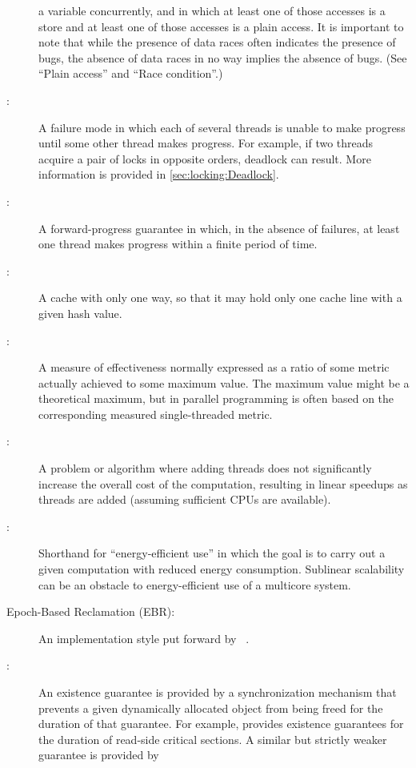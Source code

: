 \begin{description}
	a variable concurrently, and in which at least one of those
	accesses is a store and at least one of those accesses
	is a plain access.
	It is important to note that while the presence of data races
	often indicates the presence of bugs, the absence of data races
	in no way implies the absence of bugs.
	(See ``Plain access'' and ``Race condition''.)
\item[\IXG{Deadlock}:]
	A failure mode in which each of several threads is unable to
	make progress until some other thread makes progress.
	For example, if two threads acquire a pair of locks in opposite
	orders, deadlock can result.
	More information is provided in
	\cref{sec:locking:Deadlock}.
\item[\IXG{Deadlock Free}:]
	A forward-progress guarantee in which, in the absence of
	failures, at least one thread makes progress within a finite
	period of time.
\item[\IXGh{Direct-Mapped}{Cache}:]
	A cache with only one way, so that it may hold only one cache
	line with a given hash value.
\item[\IXG{Efficiency}:]
	A measure of effectiveness normally expressed as a ratio
	of some metric actually achieved to some maximum value.
	The maximum value might be a theoretical maximum, but in
	parallel programming is often based on the corresponding
	measured single-threaded metric.
\item[\IXG{Embarrassingly Parallel}:]
	A problem or algorithm where adding threads does not significantly
	increase the overall cost of the computation, resulting in
	linear speedups as threads are added (assuming sufficient
	CPUs are available).
\item[\IXGalth{Energy Efficiency}{energy}{efficiency}:]
	Shorthand for ``energy-efficient use'' in which the goal is to
	carry out a given computation with reduced energy consumption.
	Sublinear scalability can be an obstacle to energy-efficient use
	of a multicore system.
\item[Epoch-Based Reclamation (EBR):]
	An  implementation style put forward by
	~\cite{KeirAnthonyFraserPhD,UCAM-CL-TR-579,KeirFraser2007withoutLocks}.
\item[\IXG{Existence Guarantee}:]
	An existence guarantee is provided by a synchronization mechanism
	that prevents a given dynamically allocated object from being
	freed for the duration of that guarantee.
	For example,  provides existence guarantees for the duration
	of  read-side critical sections.
	A similar but strictly weaker guarantee is provided by

\end{description}
